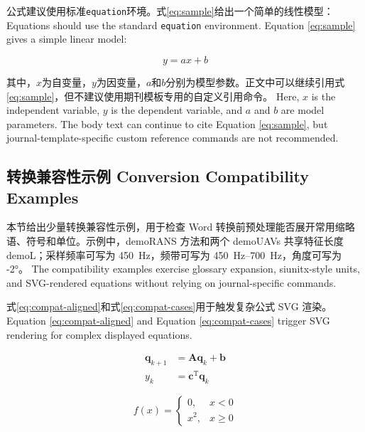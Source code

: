 \documentclass[12pt,a4paper]{article}
\begin{document}
公式建议使用标准\verb|equation|环境。式\ref{eq:sample}给出一个简单的线性模型： Equations should use the standard \verb|equation| environment. Equation \ref{eq:sample} gives a simple linear model:

\begin{equation}
  y = ax + b
  \label{eq:sample}
\end{equation}

其中，$x$为自变量，$y$为因变量，$a$和$b$分别为模型参数。正文中可以继续引用式\ref{eq:sample}，但不建议使用期刊模板专用的自定义引用命令。 Here, $x$ is the independent variable, $y$ is the dependent variable, and $a$ and $b$ are model parameters. The body text can continue to cite Equation \ref{eq:sample}, but journal-template-specific custom reference commands are not recommended.


\subsection{转换兼容性示例 Conversion Compatibility Examples}
\label{subsec:compatibility}

本节给出少量转换兼容性示例，用于检查 Word 转换前预处理能否展开常用缩略语、符号和单位。示例中，\gls{demoRANS} 方法和两个 \glspl{demoUAV} 共享特征长度 \gls{demoL}；采样频率可写为 \SI{450}{Hz}，频带可写为 \SIrange{450}{700}{Hz}，角度可写为 \ang{-2}。 The compatibility examples exercise glossary expansion, siunitx-style units, and SVG-rendered equations without relying on journal-specific commands.

\printunsrtglossary[type=symbols]
\printunsrtglossary[type=acronym]

式\ref{eq:compat-aligned}和式\ref{eq:compat-cases}用于触发复杂公式 SVG 渲染。 Equation \ref{eq:compat-aligned} and Equation \ref{eq:compat-cases} trigger SVG rendering for complex displayed equations.

\begin{equation}
  \begin{aligned}
    \label{eq:compat-aligned}
    \bm{q}_{k+1} &= \bm{A}\bm{q}_k + \bm{b} \\
    y_k &= \bm{c}^{\mathrm{T}}\bm{q}_k
  \end{aligned}
\end{equation}

\begin{equation}
  \label{eq:compat-cases}
  f(x) =
  \begin{cases}
    0, & x < 0 \\
    x^2, & x \geq 0
  \end{cases}
\end{equation}
\end{document}
